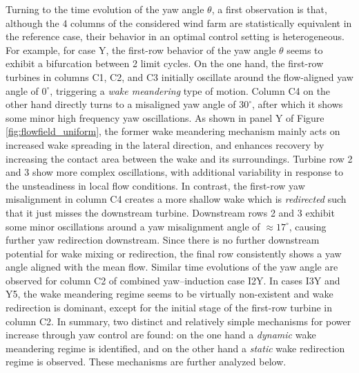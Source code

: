 	Turning to the time evolution of the yaw angle $\theta$, a first observation is that, although the 4 columns of the considered wind farm are statistically equivalent in the reference case, their behavior in an optimal control setting is heterogeneous. For example, for case Y, the first-row behavior of the yaw angle $\theta$ seems to exhibit a bifurcation between 2 limit cycles. On the one hand, the first-row turbines in columns C1, C2, and C3 initially oscillate around the flow-aligned yaw angle of $0^\circ$, triggering a \emph{wake meandering} type of motion. Column C4 on the other hand directly turns to a misaligned yaw angle of $30^\circ$, after which it shows some minor high frequency yaw oscillations. As shown in panel Y of Figure \ref{fig:flowfield_uniform}, the former wake meandering mechanism mainly acts on increased wake spreading in the lateral direction, and enhances recovery by increasing the contact area between the wake and its surroundings. Turbine row 2 and 3 show more complex oscillations, with additional variability in response to the unsteadiness in local flow conditions. In contrast, the first-row yaw misalignment in column C4 creates a more shallow wake which is \emph{redirected} such that it just misses the downstream turbine. Downstream rows 2 and 3 exhibit some minor oscillations around a yaw misalignment angle of $\approx 17^\circ$, causing further yaw redirection downstream. Since there is no further downstream potential for wake mixing or redirection, the final row consistently shows a yaw angle aligned with the mean flow. Similar time evolutions of the yaw angle are observed for column C2 of combined yaw--induction case I2Y. In cases I3Y and Y5, the wake meandering regime seems to be virtually non-existent and wake redirection is dominant, except for the initial stage of the first-row turbine in column C2. In summary, two distinct and relatively simple mechanisms for power increase through yaw control are found: on the one hand a \emph{dynamic} wake meandering regime is identified, and on the other hand a \emph{static} wake redirection regime is observed. These mechanisms are further analyzed below.
	
